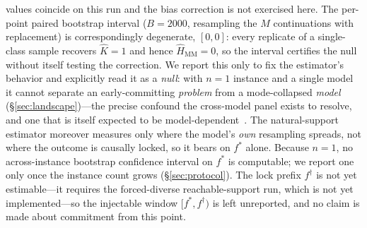 \documentclass[11pt]{article}
\begin{document}
values coincide on this run and the bias correction is not exercised here. The
per-point paired bootstrap interval ($B=2000$, resampling the $M$ continuations with
replacement) is correspondingly degenerate, $[0,0]$: every replicate of a
single-class sample recovers $\hat K=1$ and hence $\widehat H_{\mathrm{MM}}=0$, so
the interval certifies the null without itself testing the correction. We report this only to fix the
estimator's behavior and explicitly read it as a \emph{null}: with $n=1$ instance
and a single model it cannot separate an early-committing \emph{problem} from a
mode-collapsed \emph{model} (\S\ref{sec:landscape})---the precise confound the
cross-model panel exists to resolve, and one that is itself expected to be
model-dependent~\citep{entropydynamics2026,zhang2025noveltybench,diversitycollapse2025}.
The natural-support estimator moreover measures only where the model's \emph{own}
resampling spreads, not where the outcome is causally locked, so it bears on
$f^\ast$ alone. Because $n=1$, no across-instance bootstrap confidence interval on
$f^\ast$ is computable; we report one only once the instance count grows
(\S\ref{sec:protocol}). The lock prefix $f^\dagger$ is not yet estimable---it requires the
forced-diverse reachable-support run, which is not yet implemented---so the
injectable window $[f^\ast,f^\dagger)$ is left unreported, and no claim is made
about commitment from this point.
\end{document}
